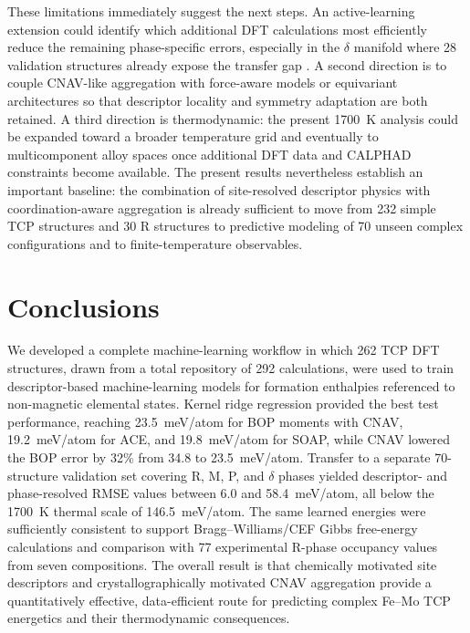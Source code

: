 \documentclass[prb,twocolumn,floatfix]{revtex4-2}
\begin{document}
These limitations immediately suggest the next steps. An active-learning extension could identify which additional DFT calculations most efficiently reduce the remaining phase-specific errors, especially in the $\delta$ manifold where 28 validation structures already expose the transfer gap \cite{Jinnouchi2019,Butler2018}. A second direction is to couple CNAV-like aggregation with force-aware models or equivariant architectures so that descriptor locality and symmetry adaptation are both retained. A third direction is thermodynamic: the present 1700~K analysis could be expanded toward a broader temperature grid and eventually to multicomponent alloy spaces once additional DFT data and CALPHAD constraints become available. The present results nevertheless establish an important baseline: the combination of site-resolved descriptor physics with coordination-aware aggregation is already sufficient to move from 232 simple TCP structures and 30 R structures to predictive modeling of 70 unseen complex configurations and to finite-temperature observables.

\section{Conclusions}

We developed a complete machine-learning workflow in which 262 TCP DFT structures, drawn from a total repository of 292 calculations, were used to train descriptor-based machine-learning models for formation enthalpies referenced to non-magnetic elemental states. Kernel ridge regression provided the best test performance, reaching 23.5~meV/atom for BOP moments with CNAV, 19.2~meV/atom for ACE, and 19.8~meV/atom for SOAP, while CNAV lowered the BOP error by 32\% from 34.8 to 23.5~meV/atom. Transfer to a separate 70-structure validation set covering R, M, P, and $\delta$ phases yielded descriptor- and phase-resolved RMSE values between 6.0 and 58.4~meV/atom, all below the 1700~K thermal scale of 146.5~meV/atom. The same learned energies were sufficiently consistent to support Bragg--Williams/CEF Gibbs free-energy calculations and comparison with 77 experimental R-phase occupancy values from seven compositions. The overall result is that chemically motivated site descriptors and crystallographically motivated CNAV aggregation provide a quantitatively effective, data-efficient route for predicting complex Fe--Mo TCP energetics and their thermodynamic consequences.



\end{document}
